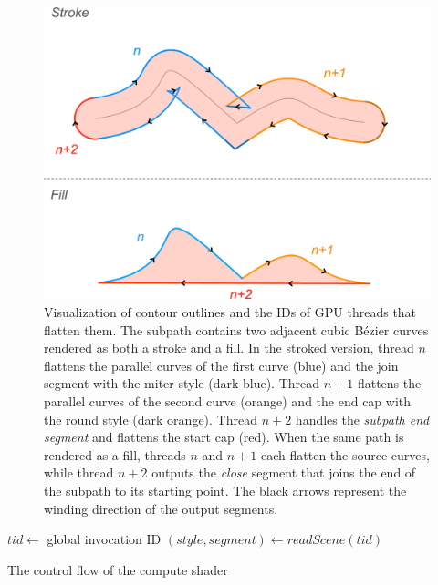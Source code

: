 \documentclass[sigconf, nonacm]{acmart}
\begin{document}
\begin{center}
\begin{figure}
    \includegraphics[scale=0.18]{stroke_threads}
    \caption{Visualization of contour outlines and the IDs of GPU threads that flatten them. The subpath contains two adjacent cubic Bézier curves rendered as both a stroke and a fill. In the stroked version, thread $n$ flattens the parallel curves of the first curve (blue) and the join segment with the miter style (dark blue). Thread $n + 1$ flattens the parallel curves of the second curve (orange) and the end cap with the round style (dark orange). Thread $n + 2$ handles the \emph{subpath end segment} and flattens the start cap (red). When the same path is rendered as a fill, threads $n$ and $n + 1$ each flatten the source curves, while thread $n + 2$ outputs the \emph{close} segment that joins the end of the subpath to its starting point. The black arrows represent the winding direction of the output segments.}
    \label{fig:stroke_threads}
\end{figure}
\end{center}

\begin{algorithm}
  $tid \gets$ global invocation ID\;
  $(style, segment) \gets readScene(tid)$\;
\caption{The control flow of the compute shader}
\label{alg:shader-flow}
\end{algorithm}
\end{document}
